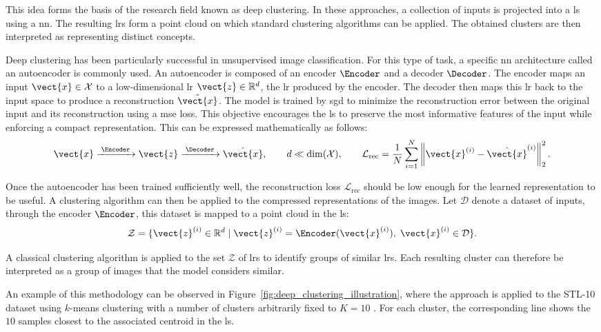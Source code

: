 

This idea forms the basis of the research field known as deep clustering.
In these approaches, a collection of inputs is projected into a \gls{ls} using a \gls{nn}.
The resulting \glspl{lr} form a point cloud on which standard clustering algorithms can be applied.
The obtained clusters are then interpreted as representing distinct concepts.

Deep clustering has been particularly successful in unsupervised image classification.
For this type of task, a specific \gls{nn} architecture called an autoencoder is commonly used.
An autoencoder is composed of an encoder $\Encoder$ and a decoder $\Decoder$.
The encoder maps an input $\vect{x} \in \mathcal{X}$ to a low-dimensional \gls{lr} $\vect{z} \in \mathbb{R}^d$, the \gls{lr} produced by the encoder.
The decoder then maps this \gls{lr} back to the input space to produce a reconstruction $\hat{\vect{x}}$.
The model is trained by \gls{sgd} to minimize the reconstruction error between the original input and its reconstruction using a \gls{mse} loss.
This objective encourages the \gls{ls} to preserve the most informative features of the input while enforcing a compact representation.
This can be expressed mathematically as follows:
\[
\vect{x}
\xrightarrow{\;\Encoder\;}
\vect{z}
\xrightarrow{\;\Decoder\;}
\hat{\vect{x}},
\qquad
d \ll \dim(\mathcal{X}),
\qquad
\mathcal{L}_{\mathrm{rec}}
=
\frac{1}{N}\sum_{i=1}^{N}
\left\|\vect{x}^{(i)}-\hat{\vect{x}}^{(i)}\right\|_2^2.
\]

Once the autoencoder has been trained sufficiently well, the reconstruction loss $\mathcal{L}_{\mathrm{rec}}$ should be low enough for the learned representation to be useful.
A clustering algorithm can then be applied to the compressed representations of the images.
Let $\mathcal{D}$ denote a dataset of inputs, through the encoder $\Encoder$, this dataset is mapped to a point cloud in the \gls{ls}:
$$
\mathcal{Z} = \{\vect{z}^{(i)} \in \mathbb{R}^d \mid \vect{z}^{(i)} = \Encoder(\vect{x}^{(i)}), \; \vect{x}^{(i)} \in \mathcal{D} \}.
$$

A classical clustering algorithm is applied to the set $\mathcal{Z}$ of \glspl{lr} to identify groups of similar \glspl{lr}.
Each resulting cluster can therefore be interpreted as a group of images that the model considers similar.

An example of this methodology can be observed in Figure~\ref{fig:deep_clustering_illustration}, where the approach is applied to the STL-10 dataset \parencite{coates2011analysis} using $k$-means clustering \parencite{macqueen1967multivariate} with a number of clusters arbitrarily fixed to $K = 10$ \parencite{xie_unsupervised_2016}.
For each cluster, the corresponding line shows the $10$ samples closest to the associated centroid in the \gls{ls}.

